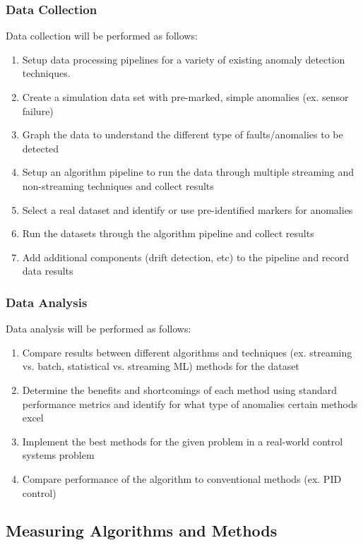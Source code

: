\subsubsection{Data Collection}
Data collection will be performed as follows:
\begin{enumerate}
    \item Setup data processing pipelines for a variety of existing anomaly detection techniques.
    \item Create a simulation data set with pre-marked, simple anomalies (ex. sensor failure) 
    \item Graph the data to understand the different type of faults/anomalies to be detected
    \item Setup an algorithm pipeline to run the data through multiple streaming and non-streaming techniques and collect results
    \item Select a real dataset and identify or use pre-identified markers for anomalies
    \item Run the datasets through the algorithm pipeline and collect results
    \item Add additional components (drift detection, etc) to the pipeline and record data results 
\end{enumerate}

\subsubsection{Data Analysis}
Data  analysis will be performed as follows:
\begin{enumerate}
    \item Compare results between different algorithms and techniques (ex. streaming vs. batch, statistical vs. streaming ML) methods for the dataset 
    \item Determine the benefits and shortcomings of each method using standard performance metrics and identify for what type of anomalies certain methods excel
    \item Implement the best methods for the given problem in a real-world control systems problem
    \item Compare performance of the algorithm to conventional methods (ex. PID control)
\end{enumerate}

\subsection{Measuring Algorithms and Methods}

